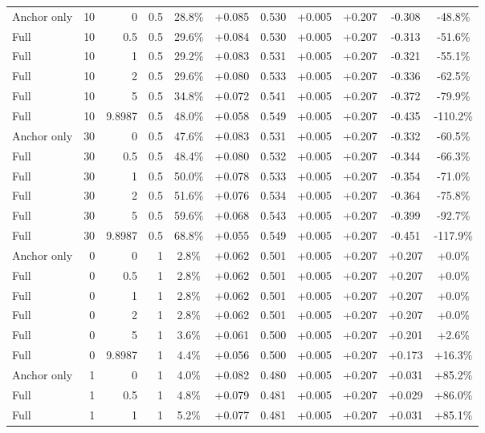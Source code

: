 \begin{table}[htbp]
\begin{tabular}{lrrrccccccc}
Anchor only & 10 & 0 & 0.5 & 28.8\% & +0.085 & 0.530 & +0.005 & +0.207 & -0.308 & -48.8\% \\
Full & 10 & 0.5 & 0.5 & 29.6\% & +0.084 & 0.530 & +0.005 & +0.207 & -0.313 & -51.6\% \\
Full & 10 & 1 & 0.5 & 29.2\% & +0.083 & 0.531 & +0.005 & +0.207 & -0.321 & -55.1\% \\
Full & 10 & 2 & 0.5 & 29.6\% & +0.080 & 0.533 & +0.005 & +0.207 & -0.336 & -62.5\% \\
Full & 10 & 5 & 0.5 & 34.8\% & +0.072 & 0.541 & +0.005 & +0.207 & -0.372 & -79.9\% \\
Full & 10 & 9.8987 & 0.5 & 48.0\% & +0.058 & 0.549 & +0.005 & +0.207 & -0.435 & -110.2\% \\
Anchor only & 30 & 0 & 0.5 & 47.6\% & +0.083 & 0.531 & +0.005 & +0.207 & -0.332 & -60.5\% \\
Full & 30 & 0.5 & 0.5 & 48.4\% & +0.080 & 0.532 & +0.005 & +0.207 & -0.344 & -66.3\% \\
Full & 30 & 1 & 0.5 & 50.0\% & +0.078 & 0.533 & +0.005 & +0.207 & -0.354 & -71.0\% \\
Full & 30 & 2 & 0.5 & 51.6\% & +0.076 & 0.534 & +0.005 & +0.207 & -0.364 & -75.8\% \\
Full & 30 & 5 & 0.5 & 59.6\% & +0.068 & 0.543 & +0.005 & +0.207 & -0.399 & -92.7\% \\
Full & 30 & 9.8987 & 0.5 & 68.8\% & +0.055 & 0.549 & +0.005 & +0.207 & -0.451 & -117.9\% \\
Anchor only & 0 & 0 & 1 & 2.8\% & +0.062 & 0.501 & +0.005 & +0.207 & +0.207 & +0.0\% \\
Full & 0 & 0.5 & 1 & 2.8\% & +0.062 & 0.501 & +0.005 & +0.207 & +0.207 & +0.0\% \\
Full & 0 & 1 & 1 & 2.8\% & +0.062 & 0.501 & +0.005 & +0.207 & +0.207 & +0.0\% \\
Full & 0 & 2 & 1 & 2.8\% & +0.062 & 0.501 & +0.005 & +0.207 & +0.207 & +0.0\% \\
Full & 0 & 5 & 1 & 3.6\% & +0.061 & 0.500 & +0.005 & +0.207 & +0.201 & +2.6\% \\
Full & 0 & 9.8987 & 1 & 4.4\% & +0.056 & 0.500 & +0.005 & +0.207 & +0.173 & +16.3\% \\
Anchor only & 1 & 0 & 1 & 4.0\% & +0.082 & 0.480 & +0.005 & +0.207 & +0.031 & +85.2\% \\
Full & 1 & 0.5 & 1 & 4.8\% & +0.079 & 0.481 & +0.005 & +0.207 & +0.029 & +86.0\% \\
Full & 1 & 1 & 1 & 5.2\% & +0.077 & 0.481 & +0.005 & +0.207 & +0.031 & +85.1\% \\

\end{tabular}
\end{table}
